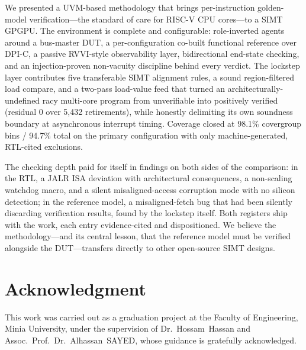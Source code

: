 \documentclass[conference]{IEEEtran}
\begin{document}
We presented a UVM-based methodology that brings per-instruction
golden-model verification---the standard of care for RISC-V CPU
cores---to a SIMT GPGPU. The environment is complete and configurable:
role-inverted agents around a bus-master DUT, a per-configuration
co-built functional reference over DPI-C, a passive RVVI-style
observability layer, bidirectional end-state checking, and an
injection-proven non-vacuity discipline behind every verdict. The
lockstep layer contributes five transferable SIMT alignment rules, a
sound region-filtered load compare, and a two-pass load-value feed that
turned an architecturally-undefined racy multi-core program from
unverifiable into positively verified (residual 0 over 5{,}432
retirements), while honestly delimiting its own soundness boundary at
asynchronous interrupt timing. Coverage closed at 98.1\% covergroup bins /
94.7\% total on the primary configuration with only machine-generated,
RTL-cited exclusions.

The checking depth paid for itself in findings on both sides of the
comparison: in the RTL, a JALR ISA deviation with architectural
consequences, a non-scaling watchdog macro, and a silent
misaligned-access corruption mode with no silicon detection; in the
reference model, a misaligned-fetch bug that had been silently
discarding verification results, found by the lockstep itself. Both
registers ship with the work, each entry evidence-cited and
dispositioned. We believe the methodology---and its central lesson,
that the reference model must be verified alongside the DUT---transfers
directly to other open-source SIMT designs.

\section*{Acknowledgment}
This work was carried out as a graduation project at the Faculty of
Engineering, Minia University, under the supervision of
Dr.~Hossam~Hassan and Assoc.~Prof.~Dr.~Alhassan~SAYED, whose guidance is
gratefully acknowledged.
\end{document}
